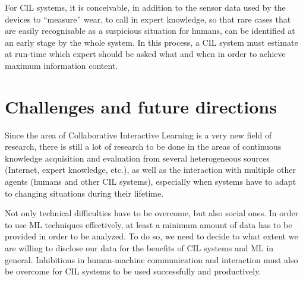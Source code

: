\documentclass[conference]{IEEEtran}
\begin{document}
For CIL systems, it is conceivable, in addition to the sensor data used by the devices to ``measure'' wear, to call in expert knowledge, so that rare cases that are easily recognisable as a suspicious situation for humans, can be identified at an early stage by the whole system.
In this process, a CIL system must estimate at run-time which expert should be asked what and when in order 
to achieve maximum information content.

\section{Challenges and future directions}
Since the area of Collaborative Interactive Learning is a very new field of research, there is still a lot of 
research to be done in the areas of continuous knowledge acquisition 
and evaluation from several heterogeneous sources (Internet, expert knowledge, etc.), 
as well as the interaction with multiple other agents (humans and other CIL systems), 
especially when systems have to adapt to changing situations during their lifetime.

Not only technical difficulties have to be overcome, but also social ones. In order to use ML techniques effectively, 
at least a minimum amount of data has to be provided in order to be analyzed. To do so, we need to decide 
to what extent we are willing to disclose our data for the benefits of CIL systems and ML in general.
Inhibitions in human-machine communication and interaction must also be overcome for CIL systems to be used 
successfully and productively.
\end{document}
